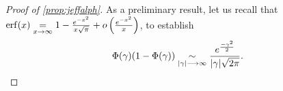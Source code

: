 \begin{proof}[Proof of \cref{prop:jeffalph}]
    
As a preliminary result, let us recall that $\operatorname{erf}(x)\overset{}{\underset{x\rightarrow\infty}{=}}1-\frac{e^{-x^2}}{x\sqrt{\pi}} + o\left(\frac{e^{-x^2}}{x}\right)$, to establish
\begin{equation}\label{eq:Jasymp:Phi(1-Phi)equi}
    \Phi(\gamma)(1-\Phi(\gamma))\underset{|\gamma|\longrightarrow\infty}{\sim} \frac{e^{\frac{-\gamma^2}{2}}}{|\gamma|\sqrt{2\pi}}.
\end{equation}



\end{proof}
